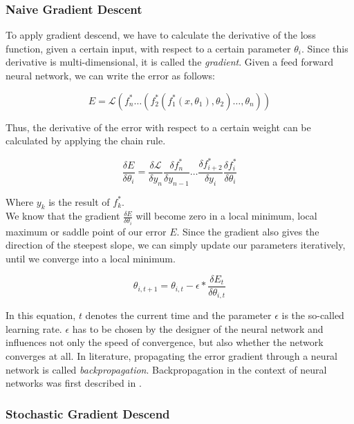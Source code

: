 \subsubsection{Naive Gradient Descent}
\label{sec:gradient_descend}
To apply gradient descend, we have to calculate the derivative of the loss function, given a certain input, with respect to a certain parameter $\theta_i$. Since this derivative is multi-dimensional, it is called the \textit{gradient}. Given a feed forward neural network, we can write the error as follows:

\[
E = \mathcal{L}(f^*_n \dots (f^*_2(f^*_1(x, \theta_1), \theta_2) \dots, \theta_n))
\]

Thus, the derivative of the error with respect to a certain weight can be calculated by applying the chain rule.  

\[
\frac{\delta E}{\delta \theta_i} = 
	\frac{\delta \mathcal{L}}{\delta y_n}
	\frac{\delta f^*_n}{\delta y_{n - 1}}
	\dots
	\frac{\delta f^*_{i + 2}}{\delta y_i}
	\frac{\delta f^*_i}{\delta \theta_i}
\]

Where $y_k$ is the result of $f^*_k$. \\
We know that the gradient $\frac{\delta E}{\delta \theta_i}$ will become zero in a local minimum, local maximum or saddle point of our error $E$. Since the gradient also gives the direction of the steepest slope, we can simply update our parameters iteratively, until we converge into a local minimum.

\[
	\theta_{i, t+1} = \theta_{i, t} - \epsilon * \frac{\delta E_{t}}{\delta \theta_{i, t}}
\]

In this equation, $t$ denotes the current time and the parameter $\epsilon$ is the so-called learning rate. $\epsilon$ has to be chosen by the designer of the neural network and influences not only the speed of convergence, but also whether the network converges at all. In literature, propagating the error gradient through a neural network is called \textit{backpropagation}. Backpropagation in the context of neural networks was first described in \cite{werbos1974beyond}.

\subsubsection{Stochastic Gradient Descend}

